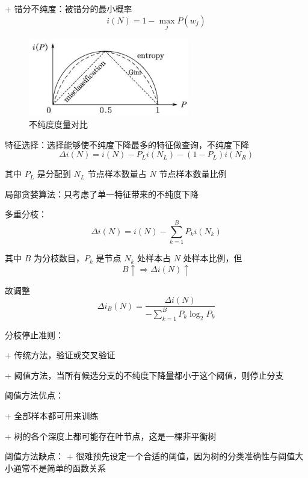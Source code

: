 \documentclass[openany]{ctexbook}
\theoremstyle{kaiti}
\theoremstyle{normal}
\begin{document}
+ 错分不纯度：被错分的最小概率 
  \begin{equation}
  i\left(N \right)=1-\max_jP\left(w_j \right)
  \end{equation}

\begin{figure}
  \centering
  \includegraphics[width=7cm]{1627808735615-11.2.jpg}
  \caption{不纯度度量对比}
\end{figure}

特征选择：选择能够使不纯度下降最多的特征做查询，不纯度下降
\begin{equation}
\Delta i\left(N \right)=i\left(N \right)-P_Li\left(N_L \right)-\left(1-P_L \right)i\left(N_R \right)
\end{equation}

其中 $P_L$ 是分配到 $N_L$ 节点样本数量占 $N$ 节点样本数量比例

局部贪婪算法：只考虑了单一特征带来的不纯度下降

多重分枝：
\begin{equation}
\Delta i\left(N \right)=i\left(N \right)-\sum_{k=1}^{B}P_ki\left(N_k \right)
\end{equation}

其中 $B$ 为分枝数目，$P_k$ 是节点 $N_k$ 处样本占 $N$ 处样本比例，但
\begin{equation}
B\uparrow \Rightarrow \Delta i\left(N \right)\uparrow
\end{equation}

故调整
\begin{equation}
\Delta i_B\left(N \right)=
\frac{\Delta i\left(N \right)}{-\displaystyle\sum_{k=1}^{B}P_k\log_2P_k}
\end{equation}

分枝停止准则：

+ 传统方法，验证或交叉验证

+ 阈值方法，当所有候选分支的不纯度下降量都小于这个阈值，则停止分支

阈值方法优点：

+ 全部样本都可用来训练

+ 树的各个深度上都可能存在叶节点，这是一棵非平衡树

阈值方法缺点：
+ 很难预先设定一个合适的阈值，因为树的分类准确性与阈值大小通常不是简单的函数关系
\end{document}
